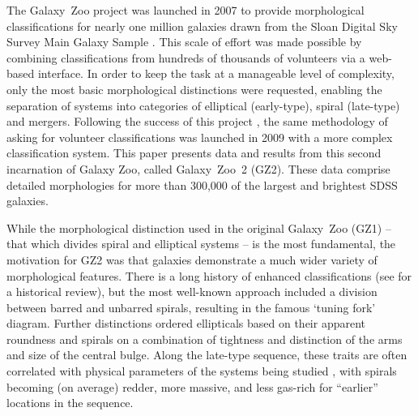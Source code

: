 \documentclass[useAMS,usenatbib]{mn2e}
\begin{document}
The Galaxy~Zoo project \citep{lin08} was launched in 2007 to provide morphological classifications for nearly one million galaxies drawn from the Sloan Digital Sky Survey \citep[SDSS;][]{yor00} Main Galaxy Sample \citep{str02}. This scale of effort was made possible by combining classifications from hundreds of thousands of volunteers via a web-based interface. In order to keep the task at a manageable level of complexity, only the most basic morphological distinctions were requested, enabling the separation of systems into categories of elliptical (early-type), spiral (late-type) and mergers. Following the success of this project \citep{lin08,lin11}, the same methodology of asking for volunteer classifications was launched in 2009 with a more complex classification system. This paper presents data and results from this second incarnation of Galaxy Zoo, called Galaxy~Zoo~2 (GZ2). These data comprise detailed morphologies for more than 300,000 of the largest and brightest SDSS galaxies.

While the morphological distinction used in the original Galaxy~Zoo (GZ1) -- that which divides spiral and elliptical systems -- is the most fundamental, the motivation for GZ2 was that galaxies demonstrate a much wider variety of morphological features. There is a long history of enhanced classifications (see \citealt{but13} for a historical review), but the most well-known approach \citep{hub26} included a division between barred and unbarred spirals, resulting in the famous `tuning fork' diagram. Further distinctions ordered ellipticals based on their apparent roundness and spirals on a combination of tightness and distinction of the arms and size of the central bulge. Along the late-type sequence, these traits are often correlated with physical parameters of the systems being studied \citep{rob94}, with spirals becoming (on average) redder, more massive, and less gas-rich for ``earlier'' locations in the sequence.
\end{document}

